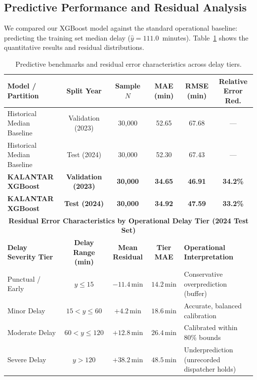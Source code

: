\documentclass[11pt,a4paper]{article}
\begin{document}
\subsection{Predictive Performance and Residual Analysis}
We compared our XGBoost model against the standard operational baseline: predicting the training set median delay ($\hat{y} = 111.0$~minutes). Table~\ref{tab:results_and_residuals} shows the quantitative results and residual distributions.

\begin{table}[!ht]
\centering
\small
\caption{Predictive benchmarks and residual error characteristics across delay tiers.}
\label{tab:results_and_residuals}
\begin{tabularx}{\textwidth}{lccccc}
\toprule
\textbf{Model / Partition} & \textbf{Split Year} & \textbf{Sample $N$} & \textbf{MAE (min)} & \textbf{RMSE (min)} & \textbf{Relative Error Red.} \\
\midrule
Historical Median Baseline & Validation (2023) & 30,000 & 52.65 & 67.68 & --- \\
Historical Median Baseline & Test (2024)       & 30,000 & 52.30 & 67.43 & --- \\
\textbf{KALANTAR XGBoost}   & \textbf{Validation (2023)} & \textbf{30,000} & \textbf{34.65} & \textbf{46.91} & \textbf{34.2\%} \\
\textbf{KALANTAR XGBoost}   & \textbf{Test (2024)}       & \textbf{30,000} & \textbf{34.92} & \textbf{47.59} & \textbf{33.2\%} \\
\midrule
\multicolumn{6}{c}{\textbf{Residual Error Characteristics by Operational Delay Tier (2024 Test Set)}} \\
\midrule
\textbf{Delay Severity Tier} & \textbf{Delay Range (min)} & \textbf{Mean Residual} & \textbf{Tier MAE} & \multicolumn{2}{l}{\textbf{Operational Interpretation}} \\
Punctual / Early & $y \le 15$ & $-11.4\,\mathrm{min}$ & $14.2\,\mathrm{min}$ & \multicolumn{2}{l}{Conservative overprediction (buffer)} \\
Minor Delay      & $15 < y \le 60$ & $+4.2\,\mathrm{min}$ & $18.6\,\mathrm{min}$ & \multicolumn{2}{l}{Accurate, balanced calibration} \\
Moderate Delay   & $60 < y \le 120$ & $+12.8\,\mathrm{min}$ & $26.4\,\mathrm{min}$ & \multicolumn{2}{l}{Calibrated within 80\% bounds} \\
Severe Delay     & $y > 120$ & $+38.2\,\mathrm{min}$ & $48.5\,\mathrm{min}$ & \multicolumn{2}{l}{Underprediction (unrecorded dispatcher holds)} \\
\bottomrule
\end{tabularx}
\end{table}
\end{document}
